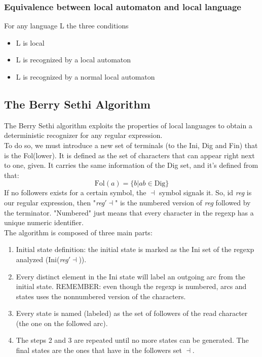 \documentclass[10pt,a4paper]{article}
\begin{document}
				\subsubsection{Equivalence between local automaton and local language}
					For any language L the three conditions
					\begin{itemize}
						\item L is local
						\item L is recognized by a local automaton
						\item L is recognized by a normal local automaton
					\end{itemize}
			
			\subsection{The Berry Sethi Algorithm}
				The Berry Sethi algorithm exploits the properties of local languages to obtain a deterministic recognizer for any regular expression.\\
				To do so, we must introduce a new set of terminals (to the Ini, Dig and Fin) that is the Fol(lower). It is defined as the set of characters that can appear right next to one, given. It carries the same information of the Dig set, and it's defined from that:
				\begin{equation}
					\text{Fol}(a) = \{ b \vert ab \in \text{Dig} \}
				\end{equation}
				If no followers exists for a certain symbol, the $\dashv$ symbol signals it. So, id \emph{reg} is our regular expression, then "\emph{reg}$\prime \dashv$" is the numbered version of \emph{reg} followed by the terminator. "Numbered" just means that every character in the regexp has a unique numeric identifier.\\
				The algorithm is composed of three main parts:
				\begin{enumerate}
					\item Initial state definition: the initial state is marked as the Ini set of the regexp analyzed (Ini(\emph{reg}$\prime \dashv$)).
					\item Every distinct element in the Ini state will label an outgoing arc from the initial state. REMEMBER: even though the regexp is numbered, arcs and states uses the nonnumbered version of the characters. 
					\item Every state is named (labeled) as the set of followers of the read character (the one on the followed arc). 
					\item The steps 2 and 3 are repeated until no more states can be generated. The final states are the ones that have in the followers set $\dashv$.
				\end{enumerate}
				
\end{document}
